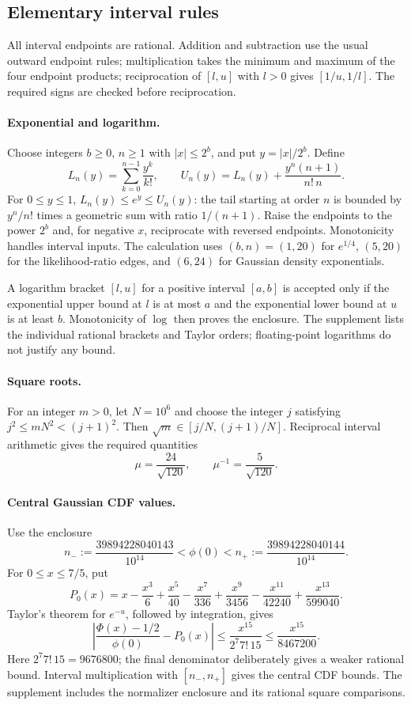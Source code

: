\documentclass[11pt]{article}
\theoremstyle{remark}
\begin{document}
\subsection{Elementary interval rules}
All interval endpoints are rational. Addition and subtraction use the usual
outward endpoint rules; multiplication takes the minimum and maximum of the
four endpoint products; reciprocation of $[l,u]$ with $l>0$ gives
$[1/u,1/l]$. The required signs are checked before reciprocation.

\paragraph{Exponential and logarithm.}
Choose integers $b\geq0$, $n\geq1$ with $|x|\leq2^b$, and put
$y=|x|/2^b$. Define
\[
 L_n(y)=\sum_{k=0}^{n-1}\frac{y^k}{k!},\qquad
 U_n(y)=L_n(y)+\frac{y^n(n+1)}{n!\,n}.
\]
For $0\leq y\leq1$,
$L_n(y)\leq e^y\leq U_n(y)$: the tail starting at order $n$ is bounded by
$y^n/n!$ times a geometric sum with ratio $1/(n+1)$. Raise the endpoints to
the power $2^b$ and, for negative $x$, reciprocate with reversed endpoints.
Monotonicity handles interval inputs. The calculation uses $(b,n)=(1,20)$
for $e^{1/4}$, $(5,20)$ for the likelihood-ratio edges, and $(6,24)$ for
Gaussian density exponentials.

A logarithm bracket $[l,u]$ for a positive interval $[a,b]$ is accepted only
if the exponential upper bound at $l$ is at most $a$ and the exponential
lower bound at $u$ is at least $b$. Monotonicity of $\log$ then proves the
enclosure. The supplement lists the individual rational brackets and Taylor
orders; floating-point logarithms do not justify any bound.

\paragraph{Square roots.}
For an integer $m>0$, let $N=10^6$ and choose the integer $j$ satisfying
$j^2\leq mN^2<(j+1)^2$. Then
$\sqrt m\in[j/N,(j+1)/N]$. Reciprocal interval arithmetic gives the required
quantities
\[
 \mu=\frac{24}{\sqrt{120}},\qquad
 \mu^{-1}=\frac5{\sqrt{120}}.
\]

\paragraph{Central Gaussian CDF values.}
Use the enclosure
\[
 n_-:=\frac{39894228040143}{10^{14}}
 <\phi(0)<
 n_+:=\frac{39894228040144}{10^{14}}.
\]
For $0\leq x\leq7/5$, put
\[
 P_0(x)=x-\frac{x^3}{6}+\frac{x^5}{40}-\frac{x^7}{336}
       +\frac{x^9}{3456}-\frac{x^{11}}{42240}+\frac{x^{13}}{599040}.
\]
Taylor's theorem for $e^{-u}$, followed by integration, gives
\[
 \left|\frac{\Phi(x)-1/2}{\phi(0)}-P_0(x)\right|
 \leq\frac{x^{15}}{2^7 7!\,15}
 \leq\frac{x^{15}}{8467200}.
\]
Here $2^7 7!\,15=9676800$; the final denominator deliberately gives a
weaker rational bound. Interval multiplication with $[n_-,n_+]$ gives the central CDF bounds.
The supplement includes the normalizer enclosure and its rational square
comparisons.
\end{document}
